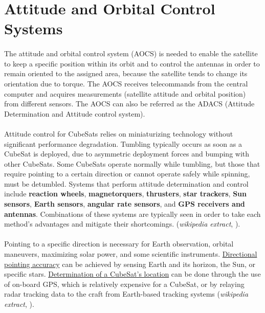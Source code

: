 \section{Attitude and Orbital Control Systems}
\paragraph{}The attitude and orbital control system (AOCS) is needed to enable the satellite to keep a specific position within its orbit and to control the antennas in order to remain oriented to the assigned area, because the satellite tends to change its orientation due to torque. The AOCS receives telecommands from the central computer and acquires measurements (satellite attitude and orbital position) from different sensors. The AOCS can also be referred as the ADACS (Attitude Determination and Attitude control system).

\paragraph{}Attitude control for CubeSats relies on miniaturizing technology without significant performance degradation. Tumbling typically occurs as soon as a CubeSat is deployed, due to asymmetric deployment forces and bumping with other CubeSats. Some CubeSats operate normally while tumbling, but those that require pointing to a certain direction or cannot operate safely while spinning, must be detumbled. Systems that perform attitude determination and control include \textbf{reaction wheels}, \textbf{magnetorquers}, \textbf{thrusters}, \textbf{star trackers}, \textbf{Sun sensors}, \textbf{Earth sensors}, \textbf{angular rate sensors}, and \textbf{GPS receivers and antennas}. Combinations of these systems are typically seen in order to take each method's advantages and mitigate their shortcomings. (\textit{wikipedia extract}, \cite{Macdonald2014}). 

\paragraph{} Pointing to a specific direction is necessary for Earth observation, orbital maneuvers, maximizing solar power, and some scientific instruments. \underline{Directional pointing accuracy} can be achieved by sensing Earth and its horizon, the Sun, or specific stars. \underline{Determination of a CubeSat's location} can be done through the use of on-board GPS, which is relatively expensive for a CubeSat, or by relaying radar tracking data to the craft from Earth-based tracking systems (\textit{wikipedia extract}, \cite{Macdonald2014}).

